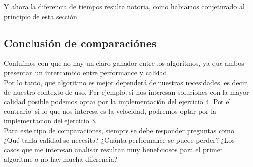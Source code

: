 Y ahora la diferencia de tiempos resulta notoria, como habiamos conjeturado al principio de esta sección. \\


\subsection{Conclusión de comparaciónes}
Conluímos con que no hay un claro ganador entre los algoritmos, ya que ambos presentan un intercambio entre performance y calidad. \\
Por lo tanto, que algoritmo es mejor dependerá de nuestras necesidades, es decir, de nuestro contexto de uso. Por ejemplo, si nos interesan soluciones con la mayor calidad posible podemos optar por la implementación del ejercicio 4. Por el contrario, si lo que nos interesa es la velocidad, podremos optar por la implementacion del ejercicio 3. \\
Para este tipo de comparaciones, siempre se debe responder preguntas como ¿Qué tanta calidad se necesita? ¿Cuánta performance se puede perder? ¿Los casos que me interesan analisar resultan muy beneficiosos para el primer algoritmo o no hay mucha diferencia?









